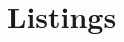 \chapter{Listings}
\let\realsection\section
\renewcommand\section{\vfill\null\newpage\realsection}
\let\realsubsection\subsection
\renewcommand\subsection{\vfill\null\newpage\realsubsection}
